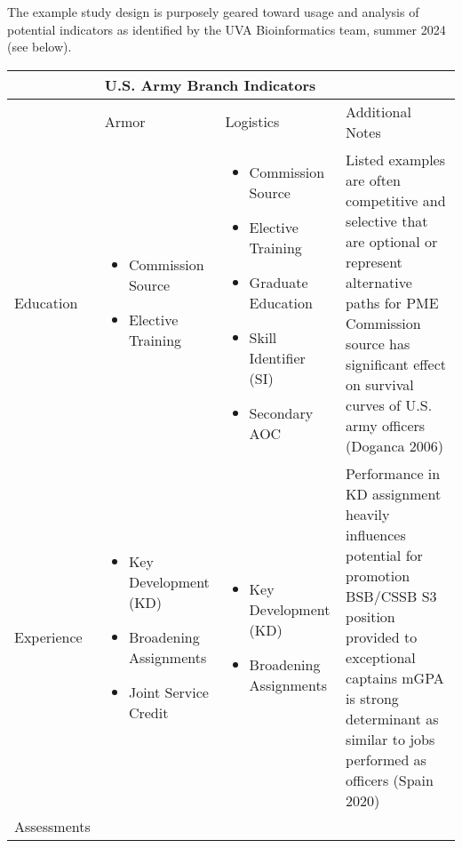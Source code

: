 \documentclass[./main.tex]{subfiles}
\begin{document}
The example study design is purposely geared toward usage and analysis of potential indicators as identified by the UVA Bioinformatics team, summer 2024 (see below). 



\newcommand{\rr}{\raggedright}
\newcommand{\tn}{\tabularnewline}

\singlespacing
\begin{tabularx}{6.5in}{|l|X|X|X|}

\hline
 &\multicolumn{3}{|l|}{U.S. Army Branch Indicators} 
 \\
\hline
 & Armor & Logistics & Additional Notes \\
\hline
Education &
\begin{itemize}
    \item Commission Source
    \item Elective Training
\end{itemize}
&
\begin{itemize}
    \item Commission Source
    \item Elective Training
    \item Graduate Education
    \item Skill Identifier (SI)
    \item Secondary AOC
\end{itemize}
&
\rr
Listed examples are often competitive and selective that are optional or represent alternative paths for PME \newline
Commission source has significant effect on survival curves of U.S. army officers (Doganca 2006)
\tn
\hline
Experience &
\rr
\begin{itemize}
    \item Key Development (KD)
    \item Broadening Assignments
    \item Joint Service Credit
\end{itemize}
 &
\rr
\begin{itemize}
    \item Key Development (KD)
    \item Broadening Assignments
\end{itemize}
&
\rr
Performance in KD assignment heavily influences potential for promotion \newline
BSB/CSSB S3 position provided to exceptional captains \newline
mGPA is strong determinant as similar to jobs performed as officers (Spain 2020)
\tn
\hline
Assessments &

\end{tabularx}
\end{document}
